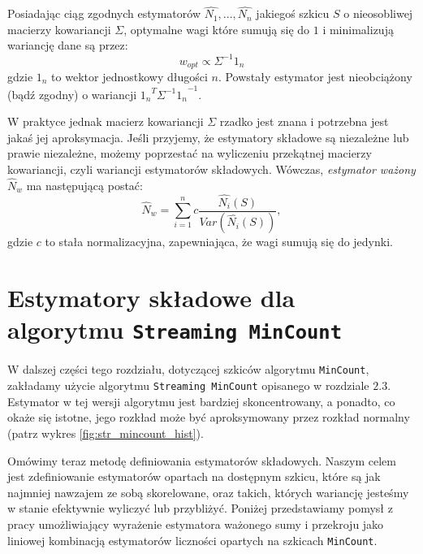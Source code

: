 \begin{lemma}
	 Posiadając ciąg zgodnych estymatorów $\hat{N_1}, ..., \hat{N_n}$ jakiegoś szkicu $S$ o nieosobliwej macierzy kowariancji $\Sigma$, optymalne wagi które sumują się do $1$ i minimalizują wariancję dane są przez:
	 \begin{equation}
	 	w_{opt} \propto  \Sigma^{-1}1_n
	 \end{equation}
	 gdzie $1_n$ to wektor jednostkowy długości $n$. Powstały estymator jest nieobciążony (bądź zgodny) o wariancji ${{1_n}^{T}\Sigma^{-1}1_n}^{-1}$.
\end{lemma}
W praktyce jednak macierz kowariancji $\Sigma$ rzadko jest znana i potrzebna jest jakaś jej aproksymacja.
Jeśli przyjemy, że estymatory składowe są niezależne
lub prawie niezależne, możemy poprzestać na wyliczeniu przekątnej macierzy kowariancji, czyli wariancji estymatorów składowych. Wówczas, \textit{estymator ważony} $\hat{N}_w$  ma następującą postać:
\begin{equation}
\label{weighted_est}
    \hat{N}_w = \sum_{i=1}^{n}c\frac{\hat{N_i}(S)}{Var(\hat{N_i}(S))},
\end{equation}
gdzie $c$ to stała normalizacyjna, zapewniająca, że wagi sumują się do jedynki.

\section{Estymatory składowe dla algorytmu \texttt{Streaming MinCount}}

W dalszej części tego rozdziału, dotyczącej szkiców algorytmu \texttt{MinCount}, zakładamy użycie algorytmu \texttt{Streaming MinCount} opisanego w rozdziale $2.3$.
Estymator w tej wersji algorytmu jest bardziej skoncentrowany, a ponadto, co okaże się istotne, jego rozkład może być aproksymowany przez rozkład normalny (patrz wykres \ref{fig:str_mincount_hist}). 

Omówimy teraz metodę  definiowania estymatorów składowych. Naszym celem jest zdefiniowanie estymatorów opartach na dostępnym szkicu, które są jak najmniej nawzajem ze sobą skorelowane, oraz takich, których wariancję jesteśmy w stanie efektywnie wyliczyć lub przybliżyć. Poniżej przedstawiamy pomysł z pracy \cite{ting} umożliwiający wyrażenie estymatora ważonego sumy i przekroju jako  liniowej kombinacją  estymatorów liczności opartych na szkicach \texttt{MinCount}.

